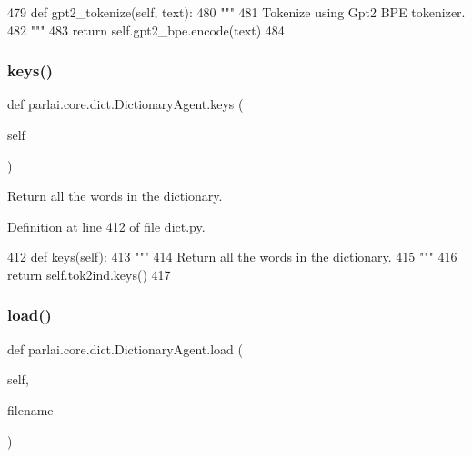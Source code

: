 \begin{DoxyCode}
479     \textcolor{keyword}{def }gpt2\_tokenize(self, text):
480         \textcolor{stringliteral}{"""}
481 \textcolor{stringliteral}{        Tokenize using Gpt2 BPE tokenizer.}
482 \textcolor{stringliteral}{        """}
483         \textcolor{keywordflow}{return} self.gpt2\_bpe.encode(text)
484 
\end{DoxyCode}
\mbox{\label{classparlai_1_1core_1_1dict_1_1DictionaryAgent_ad5abcf174648d88f2383cba7a361dd29}} 
\subsubsection{\texorpdfstring{keys()}{keys()}}
{\footnotesize\ttfamily def parlai.\+core.\+dict.\+Dictionary\+Agent.\+keys (\begin{DoxyParamCaption}\item[{}]{self }\end{DoxyParamCaption})}

\begin{DoxyVerb}Return all the words in the dictionary.
\end{DoxyVerb}
 

Definition at line 412 of file dict.\+py.


\begin{DoxyCode}
412     \textcolor{keyword}{def }keys(self):
413         \textcolor{stringliteral}{"""}
414 \textcolor{stringliteral}{        Return all the words in the dictionary.}
415 \textcolor{stringliteral}{        """}
416         \textcolor{keywordflow}{return} self.tok2ind.keys()
417 
\end{DoxyCode}
\mbox{\label{classparlai_1_1core_1_1dict_1_1DictionaryAgent_aa4229d1ba17932f588e15067afd9bf42}} 
\subsubsection{\texorpdfstring{load()}{load()}}
{\footnotesize\ttfamily def parlai.\+core.\+dict.\+Dictionary\+Agent.\+load (\begin{DoxyParamCaption}\item[{}]{self,  }\item[{}]{filename }\end{DoxyParamCaption})}

